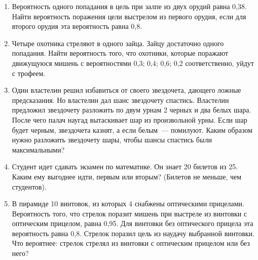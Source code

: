 \documentclass[a4paper,14pt]{extarticle}
\begin{document}
\begin{enumerate}
\item
Вероятность одного попадания в цель при залпе из двух орудий равна 0,38.
Найти вероятность поражения цели выстрелом из первого орудия, если для
второго орудия эта вероятность равна 0,8.
\item
Четыре охотника стреляют в одного зайца. Зайцу достаточно одного попадания. Найти вероятность
того, что охотники, которые поражают движущуюся мишень с  вероятностями 0,3; 0,4; 0,6; 0,2 соответственно,
уйдут с трофеем.
\item 
Один властелин решил избавиться от своего звездочета, дающего ложные предсказания. Но властелин дал шанс звездочету спастись. Властелин предложил звездочету разложить по двум урнам 2 черных и два белых шара. После чего палач наугад вытаскивает шар из произвольной урны. Если шар будет черным, звездочета казнят, а если белым~--- помилуют. Каким образом нужно разложить звездочету шары, чтобы шансы спастись были максимальными?
\item
Студент идет сдавать экзамен по математике. Он знает 20 билетов из 25. Каким ему выгоднее идти, первым или вторым? (Билетов не меньше, чем студентов).

\item
В пирамиде 10 винтовок, из которых 4 снабжены оптическими прицелами.
Вероятность того, что стрелок поразит мишень при выстреле из винтовки с
оптическим прицелом, равна 0,95. Для винтовки без оптического прицела
эта вероятность равна 0,8. Стрелок поразил цель из наудачу выбранной
винтовки. Что вероятнее: стрелок стрелял из винтовки с оптическим
прицелом или без него?


\end{enumerate}
\end{document}
